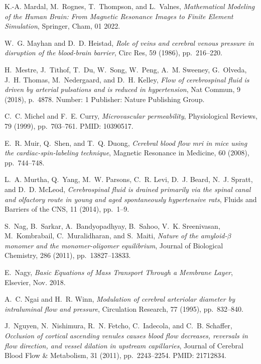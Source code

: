 \documentclass[10pt,letterpaper]{article}
\newcommand{\1}{^{(1)}}
\newcommand{\2}{^{(2)}}
\begin{document}
\begin{thebibliography}{10}
{\sc K.-A. Mardal, M.~Rognes, T.~Thompson, and L.~Valnes}, {\em Mathematical
  Modeling of the Human Brain: From Magnetic Resonance Images to Finite Element
  Simulation}, Springer, Cham, 01 2022.

{\sc W.~G. Mayhan and D.~D. Heistad}, {\em Role of veins and cerebral venous
  pressure in disruption of the blood-brain barrier}, Circ Res, 59 (1986),
  pp.~216--220.

{\sc H.~Mestre, J.~Tithof, T.~Du, W.~Song, W.~Peng, A.~M. Sweeney, G.~Olveda,
  J.~H. Thomas, M.~Nedergaard, and D.~H. Kelley}, {\em Flow of cerebrospinal
  fluid is driven by arterial pulsations and is reduced in hypertension}, Nat
  Commun, 9 (2018), p.~4878.
\newblock Number: 1 Publisher: Nature Publishing Group.

{\sc C.~C. Michel and F.~E. Curry}, {\em Microvascular permeability},
  Physiological Reviews, 79 (1999), pp.~703--761.
\newblock PMID: 10390517.

{\sc E.~R. Muir, Q.~Shen, and T.~Q. Duong}, {\em Cerebral blood flow mri in
  mice using the cardiac-spin-labeling technique}, Magnetic Resonance in
  Medicine, 60 (2008), pp.~744--748.

{\sc L.~A. Murtha, Q.~Yang, M.~W. Parsons, C.~R. Levi, D.~J. Beard, N.~J.
  Spratt, and D.~D. McLeod}, {\em Cerebrospinal fluid is drained primarily via
  the spinal canal and olfactory route in young and aged spontaneously
  hypertensive rats}, Fluids and Barriers of the CNS, 11 (2014), pp.~1--9.

{\sc S.~Nag, B.~Sarkar, A.~Bandyopadhyay, B.~Sahoo, V.~K. Sreenivasan,
  M.~Kombrabail, C.~Muralidharan, and S.~Maiti}, {\em Nature of the
  amyloid-$\beta$ monomer and the monomer-oligomer equilibrium}, Journal of
  Biological Chemistry, 286 (2011), pp.~13827--13833.

{\sc E.~Nagy}, {\em Basic {Equations} of {Mass} {Transport} {Through} a
  {Membrane} {Layer}}, Elsevier, Nov. 2018.

{\sc A.~C. Ngai and H.~R. Winn}, {\em Modulation of cerebral arteriolar
  diameter by intraluminal flow and pressure}, Circulation Research, 77 (1995),
  pp.~832--840.

{\sc J.~Nguyen, N.~Nishimura, R.~N. Fetcho, C.~Iadecola, and C.~B. Schaffer},
  {\em Occlusion of cortical ascending venules causes blood flow decreases,
  reversals in flow direction, and vessel dilation in upstream capillaries},
  Journal of Cerebral Blood Flow \& Metabolism, 31 (2011), pp.~2243--2254.
\newblock PMID: 21712834.


\end{thebibliography}
\end{document}
